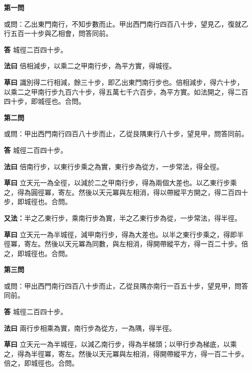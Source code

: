 \documentclass[11pt,a4paper]{article}
\newcommand{\problem}[1]{\par\noindent\textbf{\color{problemcolor}#1}\par\nopagebreak}
\newcommand{\answer}[1]{\par\noindent\textbf{答} #1\par}
\newcommand{\method}[1]{\par\noindent\textbf{法曰} #1\par}
\newcommand{\workings}[1]{\par\noindent\textbf{草曰} #1\par}
\begin{document}
\problem{第一問}

\noindent 或問：乙出東門南行，不知步數而止。甲出西門南行四百八十步，望見乙，復就乙行五百一十步與乙相會，問答同前。

\answer{城徑二百四十步。}

\method{倍相減步，以乘二之甲南行步，為平方實，得城徑。}

\workings{識別得二行相減，餘三十步，即乙出東門南行步也。倍相減步，得六十步，以乘二之甲南行步九百六十步，得五萬七千六百步，為平方實。如法開之，得二百四十步，即城徑也。合問。}

\vspace{0.5cm}

\problem{第二問}

\noindent 或問：甲出西門南行四百八十步而止，乙從艮隅東行八十步，望見甲，問答同前。

\answer{城徑二百四十步。}

\method{倍南行步，以東行步乘之為實，東行步為從方，一步常法，得全徑。}

\workings{立天元一為全徑，以減於二之甲南行步，得為兩個大差也。以乙東行步乘之，得為圓徑冪，寄左。然後以天元冪與左相消，得以帶縱平方開之，得二百四十步，即城徑也。合問。}

\vspace{0.3cm}

\noindent\textbf{又法：}半之乙東行步，乘南行步為實，半之乙東行步為從，一步常法，得半徑。

\workings{立天元一為半城徑，減甲南行步，得為大差也。以半之東行步乘之，得即半徑冪，寄左。然後以天元冪為同數，與左相消，得開帶縱平方，得一百二十步。倍之，即城徑也。合問。}

\vspace{0.5cm}

\problem{第三問}

\noindent 或問：甲出西門南行四百八十步而止，乙從艮隅亦南行一百五十步，望見甲，問答同前。

\answer{城徑二百四十步。}

\method{兩行步相乘為實，南行步為從方，一為隅，得半徑。}

\workings{立天元一為半城徑，以減乙南行步，得為半梯頭；以甲行步為梯底，以乘之，得為半徑冪，寄左。然後以天元冪與左相消，得開帶縱平方，得一百二十步。倍之，即城徑也。合問。}

\vspace{0.5cm}
\end{document}
